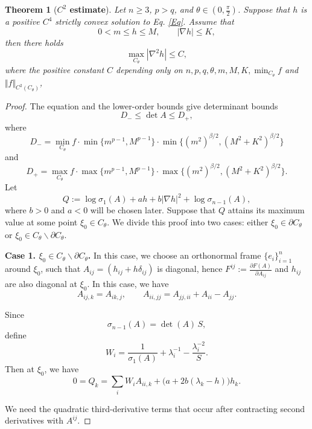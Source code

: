 \documentclass[10pt,a4paper]{amsart}
\newtheorem{theorem}{Theorem}
\begin{document}
\begin{theorem}[{\bf{$C^2$ estimate}}]\label{c2 estimate}
Let $n\geq 3$, $p>q$, and $\theta\in (0,\frac{\pi}{2})$. Suppose that $h$ is a
positive $C^4$ strictly convex solution to Eq. \eqref{Eq}. Assume that
\[
        0<m\leq h\leq M,\qquad |\nabla h|\leq K,
\]
then there holds 
\begin{equation}\label{d1}
        \max_{C_{\theta}}|\nabla^2h|\leq C,
\end{equation}
where the positive constant $C$ depending only on
$n,p,q,\theta,m,M,K,\min_{C_{\theta}}f$ and
$\Vert f\Vert_{C^2(C_{\theta})}$, 
\end{theorem}

\begin{proof}
The equation and the lower-order bounds give determinant bounds
\[
        D_-\leq\det A\leq D_+,
\]
where
\[
        D_- =
        \min_{C_{\theta}}f\cdot\min\{m^{p-1},M^{p-1}\}
        \cdot\min\{(m^2)^{\beta/2},(M^2+K^2)^{\beta/2}\}
\]
and
\[
        D_+ =
        \max_{C_{\theta}}f\cdot\max\{m^{p-1},M^{p-1}\}
        \cdot\max\{(m^2)^{\beta/2},(M^2+K^2)^{\beta/2}\}.
\]
Let
\begin{equation}\label{auxiliary Q}
        Q:=\log\sigma_1(A)+ah+b|\nabla h|^2+\log\sigma_{n-1}(A),
\end{equation}
where $b>0$ and $a<0$ will be chosen later. Suppose that $Q$ attains its maximum value at some point $\xi_0\in C_{\theta}$. We divide this proof into two cases: either $\xi_0\in \partial C_{\theta}$ or $\xi_0\in C_{\theta} \backslash \partial C_{\theta}$.

\noindent\textbf{Case 1. $\xi_0\in C_{\theta} \backslash \partial C_{\theta}$.}
In this case, we choose an orthonormal frame $\{e_i\}_{i=1}^n$ around $\xi_0$, such that $A_{ij}=(h_{ij}+h\delta_{ij})$ is diagonal, hence $F^{ij}:=\frac{\partial F(A)}{\partial A_{ij}}$ and $h_{ij}$ are also diagonal at $\xi_0$. In this case, we have
\[
        A_{ij,k}=A_{ik,j},\qquad
        A_{ii,jj}=A_{jj,ii}+A_{ii}-A_{jj}.
\]

Since
\[
        \sigma_{n-1}(A)=\det(A)\,S,
\]
define
\[
        W_i=\frac{1}{\sigma_1(A)}+\lambda_i^{-1}
        -\frac{\lambda_i^{-2}}{S}.
\]
Then at $\xi_0$, we have
\begin{equation}\label{Q stationary}
        0=Q_k
        =\sum_iW_iA_{ii,k}+\bigl(a+2b(\lambda_k-h)\bigr)h_k.
\end{equation}

We need the quadratic third-derivative terms that occur after contracting
second derivatives with $A^{ij}$.


\end{proof}
\end{document}
